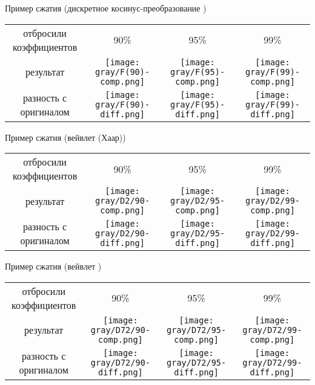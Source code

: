 \documentclass[aspectratio=169, 10pt]{beamer}
\begin{document}
	\begin{frame}{Пример сжатия (дискретное косинус-преобразование )}%
		\noindent\begin{tabularx}{\textwidth}{CCCC}%
			отбросили коэффициентов &
			90\% & 95\% & 99\% \\ 
			результат &
			\texttt{[image: gray/F(90)-comp.png]} &
			\texttt{[image: gray/F(95)-comp.png]} & 
			\texttt{[image: gray/F(99)-comp.png]} \\ 
			разность с оригиналом &
			\texttt{[image: gray/F(90)-diff.png]} &
			\texttt{[image: gray/F(95)-diff.png]} & 
			\texttt{[image: gray/F(99)-diff.png]}
		\end{tabularx}
	\end{frame}

	\begin{frame}{Пример сжатия (вейвлет  (Хаар))}%
		\noindent\begin{tabularx}{\textwidth}{CCCC}%
			отбросили коэффициентов &
			90\% & 95\% & 99\% \\ 
			результат &
			\texttt{[image: gray/D2/90-comp.png]} &
			\texttt{[image: gray/D2/95-comp.png]} & 
			\texttt{[image: gray/D2/99-comp.png]} \\ 
			разность с оригиналом &
			\texttt{[image: gray/D2/90-diff.png]} &
			\texttt{[image: gray/D2/95-diff.png]} & 
			\texttt{[image: gray/D2/99-diff.png]}
		\end{tabularx}
	\end{frame}

	\begin{frame}{Пример сжатия (вейвлет )}%
		\noindent\begin{tabularx}{\textwidth}{CCCC}%
			отбросили коэффициентов &
			90\% & 95\% & 99\% \\ 
			результат &
			\texttt{[image: gray/D72/90-comp.png]} &
			\texttt{[image: gray/D72/95-comp.png]} & 
			\texttt{[image: gray/D72/99-comp.png]} \\ 
			разность с оригиналом &
			\texttt{[image: gray/D72/90-diff.png]} &
			\texttt{[image: gray/D72/95-diff.png]} & 
			\texttt{[image: gray/D72/99-diff.png]}
		\end{tabularx}
	\end{frame}
\end{document}
